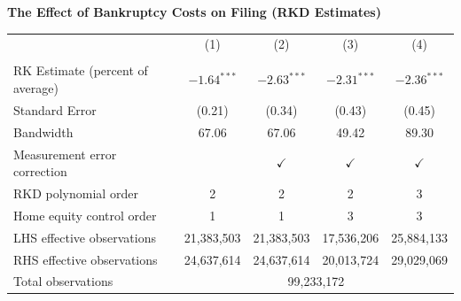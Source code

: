 \begin{minipage}{\textwidth}
\centering
\textbf{The Effect of Bankruptcy Costs on Filing (RKD Estimates)}
\par\medskip
{\small
\setlength{\tabcolsep}{7pt}
\begin{tabular}{lcccc}
\hline
\hline
 & (1) & (2) & (3) & (4) \\ \\
\hline
RK Estimate (percent of average) & $-1.64^{***}$ & $-2.63^{***}$ & $-2.31^{***}$ & $-2.36^{***}$ \\
Standard Error & (0.21) & (0.34) & (0.43) & (0.45) \\[0.2cm]
\hline
Bandwidth & 67.06 & 67.06 & 49.42 & 89.30 \\
Measurement error correction & & $\checkmark$ & $\checkmark$ & $\checkmark$ \\
RKD polynomial order & 2 & 2 & 2 & 3 \\
Home equity control order & 1 & 1 & 3 & 3 \\
\hline
LHS effective observations & 21,383,503 & 21,383,503 & 17,536,206 & 25,884,133 \\
RHS effective observations & 24,637,614 & 24,637,614 & 20,013,724 & 29,029,069 \\
\hline
Total observations & \multicolumn{4}{c}{99,233,172} \\
\hline
\hline
\end{tabular}
}
\par\medskip
\end{minipage}
